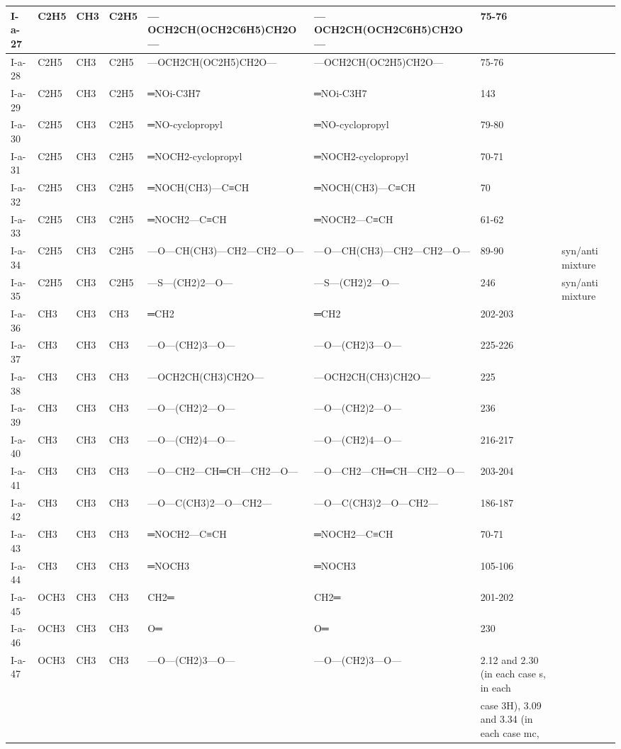\documentclass[11pt,a4paper]{article}
\begin{document}
\begin{table}[h]
\begin{tabular}{|l|l|l|l|l|l|l|l|}
I-a-27 & C2H5 & CH3 & C2H5 & —OCH2CH(OCH2C6H5)CH2O— & —OCH2CH(OCH2C6H5)CH2O— & 75-76 &  \\ \hline
I-a-28 & C2H5 & CH3 & C2H5 & —OCH2CH(OC2H5)CH2O— & —OCH2CH(OC2H5)CH2O— & 75-76 &  \\ \hline
I-a-29 & C2H5 & CH3 & C2H5 & ═NOi-C3H7 & ═NOi-C3H7 & 143 &  \\ \hline
I-a-30 & C2H5 & CH3 & C2H5 & ═NO-cyclopropyl & ═NO-cyclopropyl & 79-80 &  \\ \hline
I-a-31 & C2H5 & CH3 & C2H5 & ═NOCH2-cyclopropyl & ═NOCH2-cyclopropyl & 70-71 &  \\ \hline
I-a-32 & C2H5 & CH3 & C2H5 & ═NOCH(CH3)—C≡CH & ═NOCH(CH3)—C≡CH & 70 &  \\ \hline
I-a-33 & C2H5 & CH3 & C2H5 & ═NOCH2—C≡CH & ═NOCH2—C≡CH & 61-62 &  \\ \hline
I-a-34 & C2H5 & CH3 & C2H5 & —O—CH(CH3)—CH2—CH2—O— & —O—CH(CH3)—CH2—CH2—O— & 89-90 & syn/anti mixture \\ \hline
I-a-35 & C2H5 & CH3 & C2H5 & —S—(CH2)2—O— & —S—(CH2)2—O— & 246 & syn/anti mixture \\ \hline
I-a-36 & CH3 & CH3 & CH3 & ═CH2 & ═CH2 & 202-203 &  \\ \hline
I-a-37 & CH3 & CH3 & CH3 & —O—(CH2)3—O— & —O—(CH2)3—O— & 225-226 &  \\ \hline
I-a-38 & CH3 & CH3 & CH3 & —OCH2CH(CH3)CH2O— & —OCH2CH(CH3)CH2O— & 225 &  \\ \hline
I-a-39 & CH3 & CH3 & CH3 & —O—(CH2)2—O— & —O—(CH2)2—O— & 236 &  \\ \hline
I-a-40 & CH3 & CH3 & CH3 & —O—(CH2)4—O— & —O—(CH2)4—O— & 216-217 &  \\ \hline
I-a-41 & CH3 & CH3 & CH3 & —O—CH2—CH═CH—CH2—O— & —O—CH2—CH═CH—CH2—O— & 203-204 &  \\ \hline
I-a-42 & CH3 & CH3 & CH3 & —O—C(CH3)2—O—CH2— & —O—C(CH3)2—O—CH2— & 186-187 &  \\ \hline
I-a-43 & CH3 & CH3 & CH3 & ═NOCH2—C≡CH & ═NOCH2—C≡CH & 70-71 &  \\ \hline
I-a-44 & CH3 & CH3 & CH3 & ═NOCH3 & ═NOCH3 & 105-106 &  \\ \hline
I-a-45 & OCH3 & CH3 & CH3 & CH2═ & CH2═ & 201-202 &  \\ \hline
I-a-46 & OCH3 & CH3 & CH3 & O═ & O═ & 230 &  \\ \hline
I-a-47 & OCH3 & CH3 & CH3 & —O—(CH2)3—O— & —O—(CH2)3—O— & 2.12 and 2.30 (in each case s, in each &  \\ \hline
 &  &  &  &  &  & case 3H), 3.09 and 3.34 (in each case mc, &  \\ \hline

\end{tabular}
\end{table}
\end{document}
